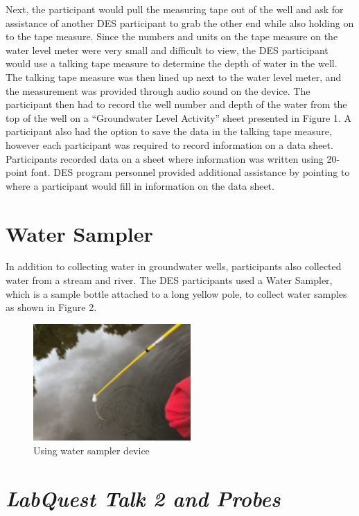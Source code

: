 \documentclass[11pt]{sig-alternate}
\begin{document}
\begin{large}
Next, the participant would pull the measuring tape out of the well and ask for assistance of another DES participant to grab the other end while also holding on to the tape measure.  Since the numbers and units on the tape measure on the water level meter were very small and difficult to view, the DES participant would use a talking tape measure to determine the depth of water in the well. The talking tape measure was then lined up next to the water level meter, and the measurement was provided through audio sound on the device. The participant then had to record the well number and depth of the water from the top of the well on a “Groundwater Level Activity” sheet presented in Figure 1. A participant also had the option to save the data in the talking tape measure, however each participant was required to record information on a data sheet. Participants recorded data on a sheet where information was written using 20-point font. DES program personnel provided additional assistance by pointing to where a participant would fill in information on the data sheet.  

\section*{Water Sampler}

In addition to collecting water in groundwater wells, participants also collected water from a stream and river. The DES participants used a Water Sampler, which is a sample bottle attached to a long yellow pole, to collect water samples as shown in Figure 2.

{\begin{figure}[htp] 
    \leftmargin
    \includegraphics[width=60mm]{figure2.png}
    \caption{Using water sampler device }
    \label{hands-on Bohr model using Styrofoam}
\end{figure}
}

\section*{\textit{LabQuest Talk 2 and Probes}}
 

\end{large}
\end{document}
